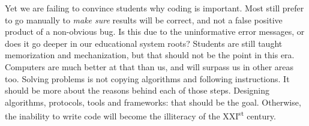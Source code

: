 Yet we are failing to convince students why coding is important. Most still prefer to go manually to \textit{make sure} results will be correct, and not a false positive product of a non-obvious bug. Is this due to the uninformative error messages, or does it go deeper in our educational system roots? Students are still taught memorization and mechanization, but that should not be the point in this era. Computers are much better at that than us, and will surpass us in other areas too. Solving problems is not copying algorithms and following instructions. It should be more about the reasons behind each of those steps. Designing algorithms, protocols, tools and frameworks: that should be the goal. Otherwise, the inability to write code will become the illiteracy of the XXI\textsuperscript{st} century.

